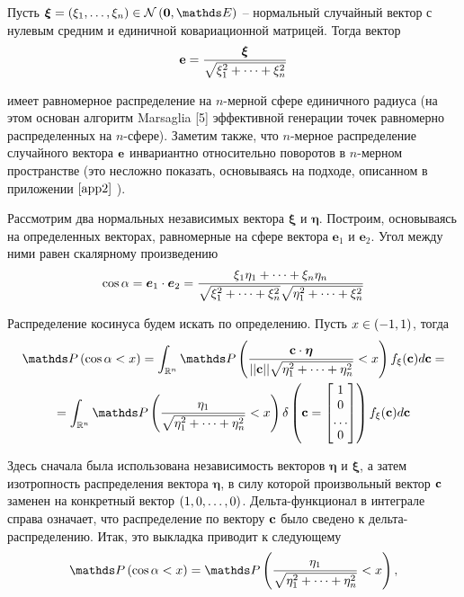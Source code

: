 Пусть $\boldsymbol{\xi} = \lb \xi_1, \dots, \xi_n \rb \in \mN \lb \boldsymbol{0}, \bbE \rb$ -- нормальный случайный вектор с нулевым средним и единичной ковариационной матрицей. Тогда вектор
\begin{gather}
	\mathbf{e} = \frac{ \boldsymbol{\xi} }{ \sqrt{ \xi_1^2 + \dots + \xi_n^2} } \notag
\end{gather}

имеет равномерное распределение на $n$-мерной сфере единичного радиуса (на этом основан алгоритм Marsaglia [5] эффективной генерации точек равномерно распределенных на $n$-сфере). Заметим также, что $n$-мерное распределение случайного вектора $\mathbf{e}$ инвариантно относительно поворотов в $n$-мерном пространстве (это несложно показать, основываясь на подходе, описанном в приложении $\ref{app2}$ ). \par

Рассмотрим два нормальных независимых вектора $\boldsymbol{\xi}$ и $\boldsymbol{\eta}$. Построим, основываясь на определенных векторах, равномерные на сфере вектора $\boldsymbol{e}_1$ и $\boldsymbol{e}_2$. Угол между ними равен скалярному произведению
\begin{gather}
\cos \alpha = \boldsymbol{e}_1 \cdot \boldsymbol{e}_2 = \frac{ \xi_1 \eta_1 + \dots + \xi_n \eta_n}{ \sqrt{\xi_1^2 + \dots + \xi_n^2} \sqrt{ \eta_1^2 + \dots + \xi_n^2} } \notag
\end{gather}

Распределение косинуса будем искать по определению. Пусть $x \in \left( -1, 1 \right)$, тогда
\begin{gather}
	\bbP \lb \cos \alpha < x \rb = \int_{\mathbb{R}^n} \bbP \lb \frac{\mf{c} \cdot \boldsymbol{\eta} }{ || \mf{c} || \sqrt{\eta_1^2 + \dots + \eta_n^2} } < x \rb f_\xi (\mf{c}) d \mf{c} = \notag \\
= \int_{\mathbb{R}^n} \bbP \lb \frac{ \eta_1 }{ \sqrt{\eta_1^2 + \dots + \eta_n^2} } < x \rb \delta \lb \mf{c} = 
\begin{bmatrix}
1 \\
0 \\
\dots \\
0
\end{bmatrix}
\rb f_\xi (\mf{c}) d \mf{c} \notag
\end{gather}

Здесь сначала была использована независимость векторов $\boldsymbol{\eta}$ и $\boldsymbol{\xi}$, а затем изотропность распределения вектора $\boldsymbol{\eta}$, в силу которой произвольный вектор $\mathbf{c}$ заменен на конкретный вектор $\left( 1, 0, \dots, 0 \right)$. Дельта-функционал в интеграле справа означает, что распределение по вектору $\mathbf{c}$ было сведено к дельта-распределению. Итак, это выкладка приводит к следующему
\begin{gather}
\bbP \lb \cos \alpha < x \rb = \bbP \lb \frac{ \eta_1 }{ \sqrt{ \eta_1^2 + \dots + \eta_n^2} } < x \rb, \notag
\end{gather}

